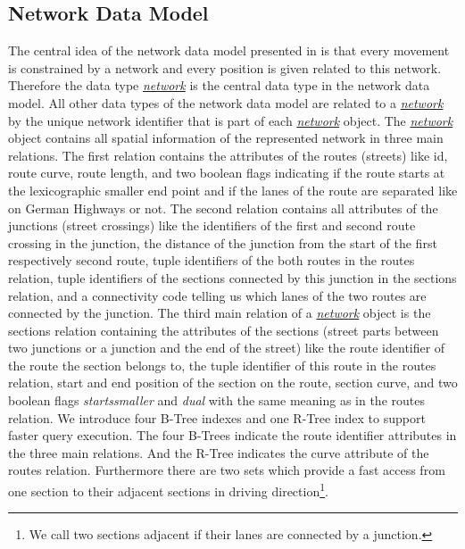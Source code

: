 \documentclass[a4paper]{article}
\newcommand{\var}[1]{\textsl{#1}}
\newcommand{\dt}[1]{\textsl{\underline{#1}}}
\begin{document}
\subsection{Network Data Model}
\label{sec:netdatamod}
The central idea of the network data model presented in \cite{1146465} is that every movement is constrained by a network and every position is given related to this network. Therefore the data type \dt{network} is the central data type in the network data model. All other data types of the network data model are related to a \dt{network} by the unique network identifier that is part of each \dt{network} object. The \dt{network} object contains all spatial information of the represented network in three main relations. The first relation contains the attributes of the routes (streets) like id, route curve, route length, and two boolean flags indicating if the route starts at the lexicographic smaller end point and if the lanes of the route are separated like on German Highways or not. The second relation contains all attributes of the junctions (street crossings) like the identifiers of the first and second route crossing in the junction, the distance of the junction from the start of the first respectively second route, tuple identifiers of the both routes in the routes relation, tuple identifiers of the sections connected by this junction in the sections relation, and a connectivity code telling us which lanes of the two routes are connected by the junction. The third main relation of a \dt{network} object is the sections relation containing the attributes of the sections (street parts between two junctions or a junction and the end of the street) like the route identifier of the route the section belongs to, the tuple identifier of this route in the routes relation, start and end position of the section on the route, section curve, and two boolean flags \var{startssmaller} and \var{dual} with the same meaning as in the routes relation. We introduce four B-Tree indexes and one R-Tree index to support faster query execution. The four B-Trees indicate the route identifier attributes in the three main relations. And the R-Tree indicates the curve attribute of the routes relation. Furthermore there are two sets which provide a fast access from one section to their adjacent sections in driving direction\footnote{We call two sections adjacent if their lanes are connected by a junction.}.
\end{document}
